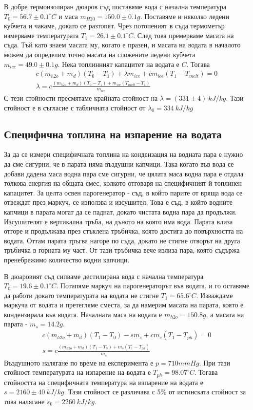 \documentclass[
 reprint,
 amsmath,amssymb,
 aps,
]{revtex4-2}
\begin{document}
В добре термоизолиран дюаров съд поставяме вода с начална температура $T_0 = 56.7 \pm 0.1 ^{\circ}C $ и маса $m_{H20} = 150.0 \pm 0.1 g$. Поставяме и няколко ледени кубчета и чакаме, докато се разтопят. Чрез потопеният в съда термометър измерваме температурата $T_1 = 26.1 \pm 0.1 ^{\circ}C $. След това премерваме масата на съда. Тъй като знаем масата му, когато е празен, и масата на водата в началото можем да определим точно масата на сложените ледени кубчета $m_{ice} = 49.0 \pm 0.1 g$. Нека топлинният капацитет на водата е $C$. Тогава
\begin{gather*}
    c(m_{h2o} + m_d)(T_0 - T_1) + \lambda m_{ice} + c m_{ice} (T_1 - T_{melt}) = 0 \\
    \lambda = c \frac{(m_{h2o} + m_d)(T_0 - T_1) + m_{ice}(T_{melt} - T_1)}{m_{ice}}
\end{gather*}
С тези стойности пресмятаме крайната стойност на $\lambda = (331 \pm 4) \ kJ/kg$. Тази стойност е в съгласие с табличната стойност от $\lambda_0 = 334 \ kJ/kg$

\subsection{Специфична топлина на изпарение на водата}
За да се измери специфичната топлина на кондензация на водната пара е нужно да сме сигурни, че в парата няма въздушни капчици. Така когато във вода се добави дадена маса водна пара сме сигурни, че цялата маса водна пара е отдала толкова енергия на общата смес, колкото отговаря на специфичният й топлинен капацитет. За целта освен парогенератор - съд, в който парите от вряща вода се отвеждат през маркуч, се използва и изсушител. Това е съд, в който водните капчици в парата могат да се паднат, докато чистата водна пара да продължи. Изсушителят е вертикална тръба, на дъното на която има вода. Парата влиза отгоре и продължава през стъклена тръбичка, която достига до повърхността на водата. Оттам парата тръгва нагоре по съда, докато не стигне отворът на друга тръбичка в горната му част. От тази тръбичка вече излиза пара, която съдържа пренебрежимо количество водни капчици. 

В дюаровият съд сипваме дестилирана вода с начална температура $T_0 = 19.6 \pm 0.1^{\circ}C$. Потапяме маркуч на парогенераторът във водата, и го оставяме да работи докато температурата на водата не стигне $T_1 = 65.6^{\circ}C$. Изваждаме маркуча от водата и претегляме сместа, за да намерим масата на парата, която е кондензирала във водата. Началната маса на водата е $m_{h2o}=150.8g$, а масата на парата - $m_s = 14.2g$. 
\begin{gather*}
    c(m_{h2o} + m_d)(T_1 - T_0) - s m_s + c m_s (T_1 - T_{ph}) = 0 \\
    s = c \frac{(m_{h2o} + m_d)(T_1 - T_0) + m_s (T_1 - T_{ph})}{m_s}
\end{gather*}
Въздушното налягане по време на експеримента е $p = 710 mmHg$. При тази стойност температурата на изпарение на водата е $T_{ph} = 98.07^{\circ}C$. Тогава стойността на специфичната температура на изпарение на водата е $s = 2160 \pm 40 \ kJ/kg$. Тази стойност се различава с 5\% от истинската стойност за това налягане $s_0 = 2260 \ kJ/kg$.
\end{document}
